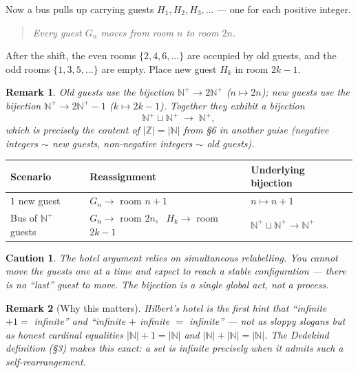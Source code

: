 \documentclass[11pt]{article}
\theoremstyle{defstyle}
\theoremstyle{thmstyle}
\theoremstyle{notstyle}
\newtheorem*{remark}{Remark}
\theoremstyle{cautionstyle}
\newtheorem*{caution}{Caution}
\newcommand{\Z}{\mathbb{Z}}
\newcommand{\N}{\mathbb{N}}
\newcommand{\Np}{\mathbb{N}^{+}}
\begin{document}
Now a bus pulls up carrying guests $H_1, H_2, H_3, \ldots$ --- one for each positive integer.

\begin{quote}
\emph{Every guest $G_n$ moves from room $n$ to room $2n$.}
\end{quote}

After the shift, the even rooms $\{2, 4, 6, \ldots\}$ are occupied by old guests, and the odd rooms $\{1, 3, 5, \ldots\}$ are empty. Place new guest $H_k$ in room $2k - 1$.

\begin{notebox}
\begin{remark}
Old guests use the bijection $\Np \to 2\Np$ ($n \mapsto 2n$); new guests use the bijection $\Np \to 2\Np - 1$ ($k \mapsto 2k - 1$). Together they exhibit a bijection
\[
  \Np \sqcup \Np \;\longrightarrow\; \Np,
\]
which is precisely the content of $|\Z| = |\N|$ from \S6 in another guise (negative integers $\sim$ new guests, non-negative integers $\sim$ old guests).
\end{remark}
\end{notebox}

\begin{center}
\renewcommand{\arraystretch}{1.5}
\begin{tabular}{|l|l|l|}
\hline
\textbf{Scenario} & \textbf{Reassignment} & \textbf{Underlying bijection} \\
\hline
$1$ new guest & $G_n \to$ room $n+1$ & $n \mapsto n+1$ \\
Bus of $\Np$ guests & $G_n \to$ room $2n$, \ $H_k \to$ room $2k-1$ & $\Np \sqcup \Np \to \Np$ \\
\hline
\end{tabular}
\end{center}

\begin{cautionbox}
\begin{caution}
The hotel argument relies on \emph{simultaneous} relabelling. You cannot move the guests one at a time and expect to reach a stable configuration --- there is no ``last'' guest to move. The bijection is a single global act, not a process.
\end{caution}
\end{cautionbox}

\begin{notebox}
\begin{remark}[Why this matters]
Hilbert's hotel is the first hint that ``infinite $+ 1 =$ infinite'' and ``infinite $+$ infinite $=$ infinite'' --- not as sloppy slogans but as honest cardinal equalities $|\N| + 1 = |\N|$ and $|\N| + |\N| = |\N|$. The Dedekind definition (\S3) makes this exact: a set is infinite precisely when it admits such a self-rearrangement.
\end{remark}
\end{notebox}
\end{document}
